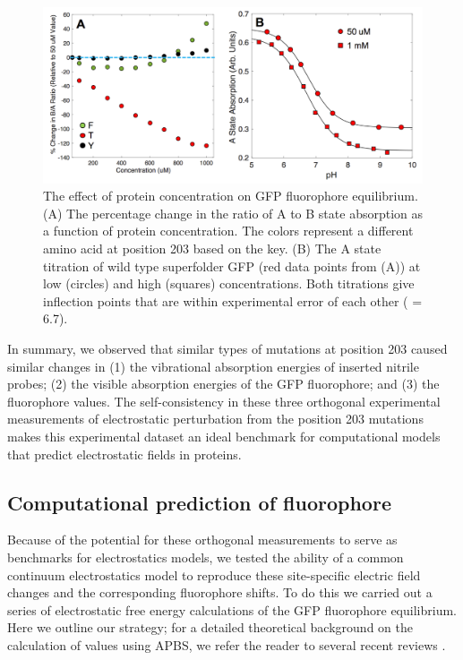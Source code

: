 \begin{figure}
    \center
    \includegraphics[width=\double]{figures-gfp-pKa/concentration_dependence.png}
    \caption[Effect of protein concentration on GFP fluorophore equilibrium]{
        The effect of protein concentration on GFP fluorophore equilibrium. 
        (A) The percentage change in the ratio of A to B state absorption as a function of protein concentration. 
        The colors represent a different amino acid at position 203 based on the key. 
        (B) The A state titration of wild type superfolder GFP (red data points from (A)) at low (circles) and high (squares) concentrations. 
        Both titrations give inflection points that are within experimental error of each other (\pKa{} = 6.7).
    }
    \label{fig:conc_depend}
\end{figure}

In summary, we observed that similar types of mutations at position 203 caused similar changes in (1) the vibrational absorption energies of inserted nitrile probes; (2) the visible absorption energies of the GFP fluorophore; and (3) the fluorophore \pKa{} values.
The self-consistency in these three orthogonal experimental measurements of electrostatic perturbation from the position 203 mutations makes this experimental dataset an ideal benchmark for computational models that predict electrostatic fields in proteins.

\subsection{Computational prediction of fluorophore \pKa{} }

Because of the potential for these orthogonal measurements to serve as benchmarks for electrostatics models, we tested the ability of a common continuum electrostatics model to reproduce these site-specific electric field changes and the corresponding fluorophore \pKa{} shifts.
To do this we carried out a series of electrostatic free energy calculations of the GFP fluorophore equilibrium.
Here we outline our strategy; for a detailed theoretical background on the calculation of \pKa{} values using APBS, we refer the reader to several recent reviews \cite{Baker2005, Baker2004, Baker2001, Wagoner2004, Unni2011}.

